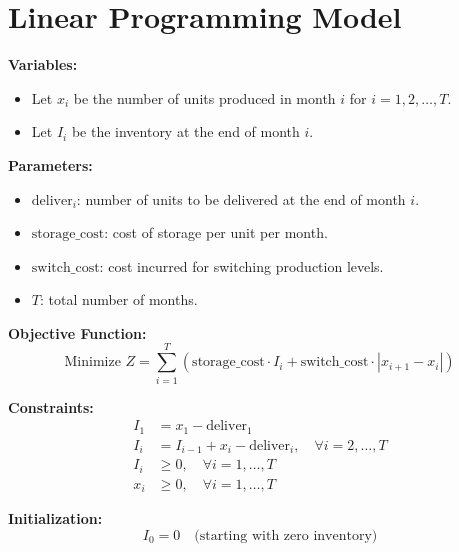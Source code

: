 \documentclass{article}
\begin{document}
\section*{Linear Programming Model}

\textbf{Variables:}
\begin{itemize}
    \item Let \( x_i \) be the number of units produced in month \( i \) for \( i = 1, 2, \ldots, T \).
    \item Let \( I_i \) be the inventory at the end of month \( i \).
\end{itemize}

\textbf{Parameters:}
\begin{itemize}
    \item \( \text{deliver}_i \): number of units to be delivered at the end of month \( i \).
    \item \( \text{storage\_cost} \): cost of storage per unit per month.
    \item \( \text{switch\_cost} \): cost incurred for switching production levels.
    \item \( T \): total number of months.
\end{itemize}

\textbf{Objective Function:}
\[
\text{Minimize } Z = \sum_{i=1}^{T} \left( \text{storage\_cost} \cdot I_i + \text{switch\_cost} \cdot |x_{i+1} - x_i| \right)
\]

\textbf{Constraints:}
\begin{align*}
I_1 & = x_1 - \text{deliver}_1 \\
I_i & = I_{i-1} + x_i - \text{deliver}_i, \quad \forall i = 2, \ldots, T \\
I_i & \geq 0, \quad \forall i = 1, \ldots, T \\
x_i & \geq 0, \quad \forall i = 1, \ldots, T
\end{align*}

\textbf{Initialization:}
\[
I_0 = 0 \quad \text{(starting with zero inventory)}
\]
\end{document}
